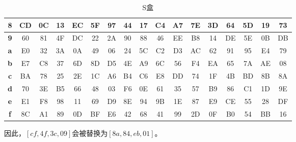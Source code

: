 \begin{table}[H]
{\begin{tabular}{|c|c|c|c|c|c|c|c|c|c|c|c|c|c|c|c|c|}
            \hline
            \textbf{8} & CD         & 0C         & 13         & EC         & 5F         & 97         & 44         & 17         & C4         & A7         & 7E         & 3D         & 64         & 5D         & 19         & 73         \\
            \hline
            \textbf{9} & 60         & 81         & 4F         & DC         & 22         & 2A         & 90         & 88         & 46         & EE         & B8         & 14         & DE         & 5E         & 0B         & DB         \\
            \hline
            \textbf{a} & E0         & 32         & 3A         & 0A         & 49         & 06         & 24         & 5C         & C2         & D3         & AC         & 62         & 91         & 95         & E4         & 79         \\
            \hline
            \textbf{b} & E7         & C8         & 37         & 6D         & 8D         & D5         & 4E         & A9         & 6C         & 56         & F4         & EA         & 65         & 7A         & AE         & 08         \\
            \hline
            \textbf{c} & BA         & 78         & 25         & 2E         & 1C         & A6         & B4         & C6         & E8         & DD         & 74         & 1F         & 4B         & BD         & 8B         & 8A         \\
            \hline
            \textbf{d} & 70         & 3E         & B5         & 66         & 48         & 03         & F6         & 0E         & 61         & 35         & 57         & B9         & 86         & C1         & 1D         & 9E         \\
            \hline
            \textbf{e} & E1         & F8         & 98         & 11         & 69         & D9         & 8E         & 94         & 9B         & 1E         & 87         & E9         & CE         & 55         & 28         & DF         \\
            \hline
            \textbf{f} & 8C         & A1         & 89         & 0D         & BF         & E6         & 42         & 68         & 41         & 99         & 2D         & 0F         & B0         & 54         & BB         & 16         \\
            \hline
        \end{tabular}
    }
    \caption{S盒}
\end{table}

因此，$ [cf, 4f, 3c, 09] $会被替换为$ [8a, 84, eb, 01] $。\\

